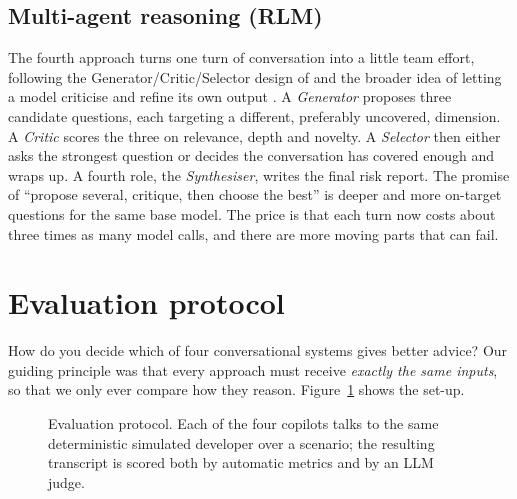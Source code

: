 \documentclass[11pt]{article}
\begin{document}
\subsection{Multi-agent reasoning (RLM)}

The fourth approach turns one turn of conversation into a little team effort, following
the Generator/Critic/Selector design of \citet{deng2025ethical} and the broader idea of
letting a model criticise and refine its own output \citep{shinn2023reflexion,
madaan2023selfrefine}. A \emph{Generator} proposes three candidate questions, each
targeting a different, preferably uncovered, dimension. A \emph{Critic} scores the three
on relevance, depth and novelty. A \emph{Selector} then either asks the strongest
question or decides the conversation has covered enough and wraps up. A fourth role, the
\emph{Synthesiser}, writes the final risk report. The promise of ``propose several,
critique, then choose the best'' is deeper and more on-target questions for the same base
model. The price is that each turn now costs about three times as many model calls, and
there are more moving parts that can fail.

\section{Evaluation protocol}
\label{sec:eval}

How do you decide which of four conversational systems gives better advice? Our guiding
principle was that every approach must receive \emph{exactly the same inputs}, so that we
only ever compare how they reason. Figure~\ref{fig:eval} shows the set-up.

\begin{figure}[t]
\centering
{}
\caption{Evaluation protocol. Each of the four copilots talks to the same deterministic
simulated developer over a scenario; the resulting transcript is scored both by automatic
metrics and by an LLM judge.}
\label{fig:eval}
\end{figure}
\end{document}
